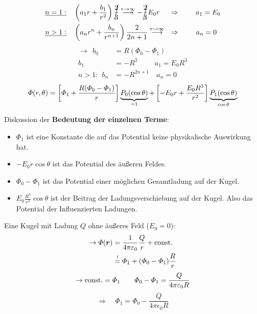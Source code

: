 \begin{enumerate}[i)]
\begin{align*}
	&\underline{n = 1:} \quad \left(a_1 r + \frac{b_1}{r^2}\right)\cancel{\frac{2}{3}} \buildrel r \to \infty \over \longrightarrow - \cancel{\frac{2}{3}} E_0 r \quad \ \Rightarrow \ \, \quad \ \  a_1 = E_0\\
	&\underline{n > 1:} \quad \left(a_n r^n + \frac{b_n}{r^{n+1}}\right) \frac{2}{2n+1} \buildrel r \to \infty \over \longrightarrow \quad \Rightarrow \qquad \: a_n = 0
	\end{align*}
	\begin{align*}
	\rightarrow \ \ b_0 &= R(\Phi_0 - \Phi_1)\\
	b_1 &= - R^3 \qquad \ \, a_1 = E_0 R^3\\
	n>1: \ \ b_n &= - R^{2n+1} \quad a_n = 0
	\end{align*}
	\begin{equation*}
	\varPhi(r,\theta) = \left[\varPhi_1 + \frac{R(\varPhi_0 - \varPhi_1)}{r}\right] \underbrace{P_0(\cos\theta)}_{=1} + \left[-E_0 r + \frac{E_0 R^3}{r^2}\right] \underbrace{P_1(\cos\theta)}_{\cos\theta}
	\end{equation*}
\end{enumerate}
Diskussion der \textbf{Bedeutung der einzelnen Terme}:
\begin{itemize}
	\item 	$ \Phi_1 $ ist eine Konstante die auf das Potential keine physikalische Auswirkung hat.
	\item $ -E_0 r \cos\theta $ ist das Potential des äußeren Feldes.
	\item $ \Phi_0 - \Phi_1 $ ist das Potential einer möglichen Gesamtladung auf der Kugel.
	\item $ E_0\frac{R^3}{r^2} \cos \theta $ ist der Beitrag der Ladungsverschiebung auf der Kugel. Also das Potential der Influenzierten Ladungen.
\end{itemize}
\begin{minipage}{.7\linewidth}
	Eine Kugel mit Ladung $ Q $ ohne äußeres Feld ($ E_0 = 0 $):
	\begin{align*}
	\rightarrow\varPhi(\bm{r}) &= \frac{1}{4 \pi \varepsilon_0} \frac{Q}{r} + \textrm{const.}\\
	&\overset{!}{=} \varPhi_1 + (\varPhi_0 - \varPhi_1) \frac{R}{r}
	\end{align*}
	\begin{equation*}
	\rightarrow \textrm{const.} = \varPhi_1 \qquad \varPhi_0 - \varPhi_1 = \frac{Q}{4 \pi \varepsilon_0 R}
	\end{equation*}
	\begin{equation*}
	\Rightarrow \quad \Phi_1 = \Phi_0 - \frac{Q}{4 \pi \epsilon_0 R}
	\end{equation*}
	\vspace{5pt}
\end{minipage}%
